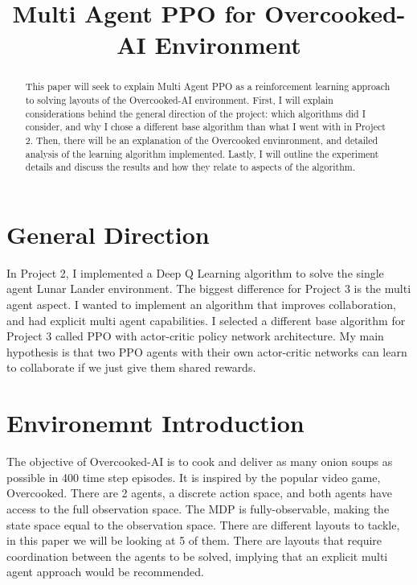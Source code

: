 \documentclass[conference]{IEEEtran}
\begin{document}
\title{Multi Agent PPO for Overcooked-AI Environment\\
}

\author{
}

\maketitle

\begin{abstract}
This paper will seek to explain Multi Agent PPO as a reinforcement learning approach to solving layouts of the Overcooked-AI environment. 
First, I will explain considerations behind the general direction of the project: which algorithms did I consider, and why I chose a different base algorithm
than what I went with in Project 2. Then, there will be an explanation of the Overcooked envinronment, and detailed analysis of the learning algorithm implemented. 
Lastly, I will outline the experiment details and discuss the results and how they relate to aspects of the algorithm. 
\end{abstract}

\section{General Direction}
In Project 2, I implemented a Deep Q Learning algorithm to solve the single agent Lunar Lander environment. The biggest difference for Project 3 is the 
multi agent aspect. I wanted to implement an algorithm that improves collaboration, and had explicit multi agent capabilities. I selected a different base algorithm for Project 3 called PPO 
with actor-critic policy network architecture. My main hypothesis is that two PPO agents with their own actor-critic networks can learn to collaborate
if we just give them shared rewards. 


\section{Environemnt Introduction}
The objective of Overcooked-AI is to cook and deliver as many onion soups as possible in 400 time step episodes. It is inspired by the 
popular video game, Overcooked. There are 2 agents, a discrete action space, and both agents have access to the full observation space. 
The MDP is fully-observable, making the state space equal to the observation space. There are different layouts to tackle, 
in this paper we will be looking at 5 of them. There are layouts that require coordination between the agents to be solved, implying that an 
explicit multi agent approach would be recommended. 
\end{document}
